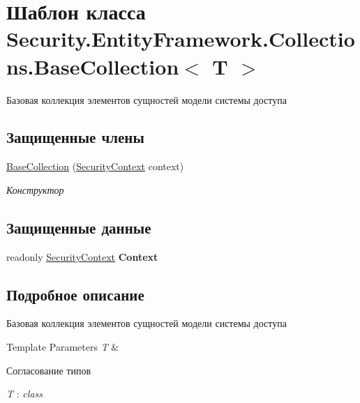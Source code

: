 \hypertarget{class_security_1_1_entity_framework_1_1_collections_1_1_base_collection}{}\section{Шаблон класса Security.\+Entity\+Framework.\+Collections.\+Base\+Collection$<$ T $>$}
\label{class_security_1_1_entity_framework_1_1_collections_1_1_base_collection}


Базовая коллекция элементов сущностей модели системы доступа  


\subsection*{Защищенные члены}
\begin{DoxyCompactItemize}
\item 
\hyperlink{class_security_1_1_entity_framework_1_1_collections_1_1_base_collection_adbdfc06a507416ccb21ef4504032b8b9}{Base\+Collection} (\hyperlink{class_security_1_1_entity_dal_1_1_security_context}{Security\+Context} context)
\begin{DoxyCompactList}\small\item\em Конструктор \end{DoxyCompactList}\end{DoxyCompactItemize}
\subsection*{Защищенные данные}
\begin{DoxyCompactItemize}
\item 
\mbox{\label{class_security_1_1_entity_framework_1_1_collections_1_1_base_collection_ab3e3051631f1ae2ddfb38e27aa675230}} 
readonly \hyperlink{class_security_1_1_entity_dal_1_1_security_context}{Security\+Context} {\bfseries Context}
\end{DoxyCompactItemize}


\subsection{Подробное описание}
Базовая коллекция элементов сущностей модели системы доступа 


\begin{DoxyTemplParams}{Template Parameters}
{\em T} & \\
\hline
\end{DoxyTemplParams}
\begin{Desc}
\item[Согласование типов]\begin{description}
\item[{\em T} : {\em class}]\end{description}
\end{Desc}


